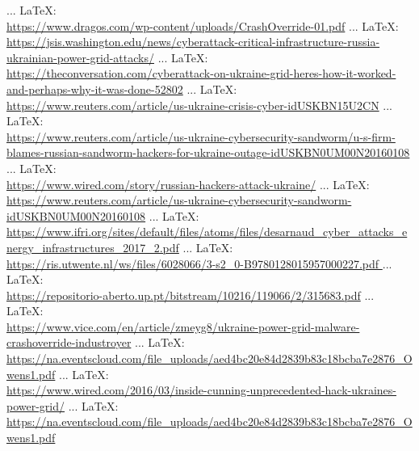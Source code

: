 \begin{thebibliography}{99}
{{{{				 ... \LaTeX:\\ \url{https://www.dragos.com/wp-content/uploads/CrashOverride-01.pdf}
				 ... \LaTeX:\\ \url{https://jsis.washington.edu/news/cyberattack-critical-infrastructure-russia-ukrainian-power-grid-attacks/}
				 ... \LaTeX:\\ \url{https://theconversation.com/cyberattack-on-ukraine-grid-heres-how-it-worked-and-perhaps-why-it-was-done-52802}
				 ... \LaTeX:\\ \url{https://www.reuters.com/article/us-ukraine-crisis-cyber-idUSKBN15U2CN}
				 ... \LaTeX:\\ \url{https://www.reuters.com/article/us-ukraine-cybersecurity-sandworm/u-s-firm-blames-russian-sandworm-hackers-for-ukraine-outage-idUSKBN0UM00N20160108}
				 ... \LaTeX:\\ \url{https://www.wired.com/story/russian-hackers-attack-ukraine/}
				 ... \LaTeX:\\ \url{https://www.reuters.com/article/us-ukraine-cybersecurity-sandworm-idUSKBN0UM00N20160108}
				 ... \LaTeX:\\ \url{https://www.ifri.org/sites/default/files/atoms/files/desarnaud_cyber_attacks_energy_infrastructures_2017_2.pdf}
				 ... \LaTeX:\\ \url{ https://ris.utwente.nl/ws/files/6028066/3-s2_0-B9780128015957000227.pdf
				}
				 ... \LaTeX:\\ \url{https://repositorio-aberto.up.pt/bitstream/10216/119066/2/315683.pdf}
				 ... \LaTeX:\\ \url{ https://www.vice.com/en/article/zmeyg8/ukraine-power-grid-malware-crashoverride-industroyer}
				 ... \LaTeX:\\ \url{https://na.eventscloud.com/file_uploads/aed4bc20e84d2839b83c18bcba7e2876_Owens1.pdf}
				 ... \LaTeX:\\ \url{https://www.wired.com/2016/03/inside-cunning-unprecedented-hack-ukraines-power-grid/}
				 ... \LaTeX:\\ \url{ https://na.eventscloud.com/file_uploads/aed4bc20e84d2839b83c18bcba7e2876_Owens1.pdf
				}
				
}}}}
\end{thebibliography}
